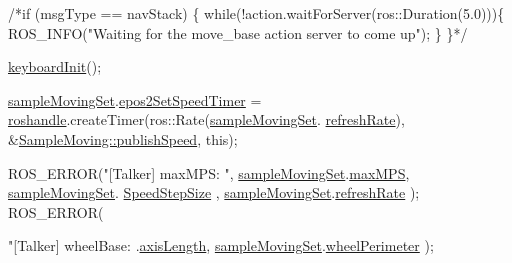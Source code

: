 \begin{DoxyCode}
    \textcolor{comment}{/*if (msgType == navStack) \{}
\textcolor{comment}{        while(!action.waitForServer(ros::Duration(5.0)))\{ ROS\_INFO("Waiting for
       the move\_base action server to come up"); \}}
\textcolor{comment}{    \}*/}

    \hyperlink{classSampleMoving_aeb90b5d883a76dfee266d55b81a8e671}{keyboardInit}();

    \hyperlink{classSampleMoving_af9c7dc0be1c4197469fbfa7aa105f1cc}{sampleMovingSet}.\hyperlink{structSampleMoving_1_1sampleMovingSettingStruct_a240644f39badda2df91ce13a783e29db}{epos2SetSpeedTimer} = 
      \hyperlink{classSampleMoving_aea05328d2394f244adba6fa37e3912d9}{roshandle}.createTimer(ros::Rate(\hyperlink{classSampleMoving_af9c7dc0be1c4197469fbfa7aa105f1cc}{sampleMovingSet}.
      \hyperlink{structSampleMoving_1_1sampleMovingSettingStruct_a6e0c54b02f6c570887fb9026388feb30}{refreshRate}), &\hyperlink{classSampleMoving_a1e43a9772d305ba33a96dc688efda406}{SampleMoving::publishSpeed},
       \textcolor{keyword}{this});

    ROS\_ERROR(\textcolor{stringliteral}{"[Talker] maxMPS: %
      "}, \hyperlink{classSampleMoving_af9c7dc0be1c4197469fbfa7aa105f1cc}{sampleMovingSet}.\hyperlink{structSampleMoving_1_1sampleMovingSettingStruct_a293fb79eebdf2c0f45aa196070391c82}{maxMPS}, \hyperlink{classSampleMoving_af9c7dc0be1c4197469fbfa7aa105f1cc}{sampleMovingSet}.
      \hyperlink{structSampleMoving_1_1sampleMovingSettingStruct_a7149b75955e1f42194433bc451688da5}{SpeedStepSize} , \hyperlink{classSampleMoving_af9c7dc0be1c4197469fbfa7aa105f1cc}{sampleMovingSet}.\hyperlink{structSampleMoving_1_1sampleMovingSettingStruct_a6e0c54b02f6c570887fb9026388feb30}{refreshRate}
      );
    ROS\_ERROR(\textcolor{stringliteral}{"[Talker] wheelBase: %
      .\hyperlink{structSampleMoving_1_1sampleMovingSettingStruct_a72168d31106a7f5e12c2eb303a487515}{axisLength}, \hyperlink{classSampleMoving_af9c7dc0be1c4197469fbfa7aa105f1cc}{sampleMovingSet}.\hyperlink{structSampleMoving_1_1sampleMovingSettingStruct_a3c927853f6d6514e45fb40e0f4c0b783}{wheelPerimeter}
      );


}
\end{DoxyCode}
